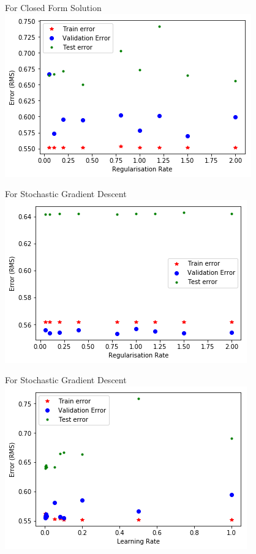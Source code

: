 \documentclass[a4paper,11pt]{article}
\begin{document}
\begin{center}
	For Closed Form Solution
	\includegraphics[scale=0.8]{3}
\end{center}
\begin{center}
	For Stochastic Gradient Descent
	\includegraphics[scale=0.8]{4}
\end{center}\vfill
\begin{center}
	For Stochastic Gradient Descent
	\includegraphics[scale=0.8]{5}
\end{center}
\end{document}
